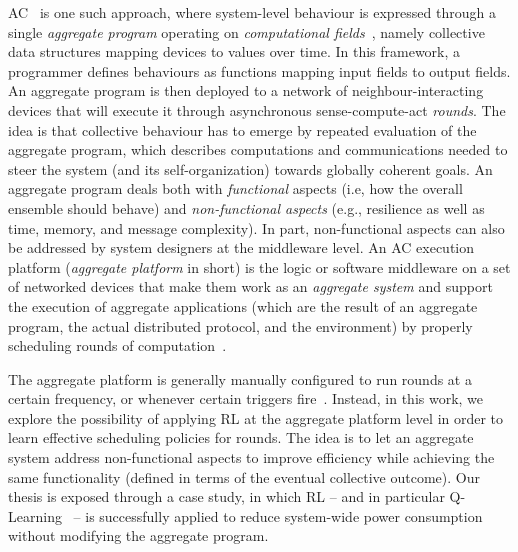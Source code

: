 \ac{AC}~\cite{DBLP:journals/computer/BealPV15}
 is one such approach,
 where system-level behaviour 
 is expressed through a single \emph{aggregate program} operating on \emph{computational fields}~\cite{DBLP:journals/jlap/ViroliBDACP19}, namely collective data structures mapping devices to values over time.
%
In this framework,
 a programmer defines behaviours
 as functions mapping input fields to output fields.
%
An aggregate program is then deployed
 to a network of neighbour-interacting devices
 that will execute it 
 through asynchronous sense-compute-act \emph{rounds}.
%
%
The idea is that collective behaviour 
 has to emerge by repeated evaluation of the aggregate program,
 which describes computations and communications
 needed to steer the system (and its self-organization)
 towards globally coherent goals.
%
An aggregate program deals both with \emph{functional} aspects (i.e, how the overall ensemble should behave) 
 and \emph{non-functional aspects} (e.g., resilience as well as time, memory, and message complexity).
%
In part, non-functional aspects 
 can also be addressed by system designers
 at the middleware level.
%
An \ac{AC} execution platform (\emph{aggregate platform} in short) is the logic or software middleware 
 on a set of networked devices 
 that make them work as an \emph{aggregate system}
 and support the execution of aggregate applications (which are the result of an aggregate program, the actual distributed protocol, and the environment) by properly scheduling rounds of computation~\cite{DBLP:journals/fi/CasadeiPPVW20}. 

The aggregate platform is generally manually configured to run rounds at a certain frequency, or whenever certain triggers fire~\cite{danilo2021lmcs}.
%
Instead, in this work, we explore the possibility of applying \ac{RL} at the aggregate platform level
 in order to learn effective scheduling policies for rounds.
%
The idea is to let an aggregate system
 address non-functional aspects  
 to improve efficiency %
 while 
 achieving the same functionality
 (defined in terms of the eventual collective outcome). 
%
Our thesis is exposed through a case study, in which \ac{RL} -- and in particular Q-Learning~\cite{DBLP:conf/icml/LauerR00} -- is successfully applied to reduce system-wide power consumption without modifying the aggregate program.   

